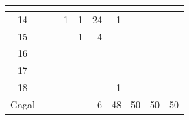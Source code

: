 \begin{minipage}[\minipagealign]{\minipagewidth}
{\begin{tabular}{|c|lllllllll|}
\multicolumn{1}{r|}{} & \multicolumn{1}{r|}{} & \\ \hline 14 & \multicolumn{1}{r|}{} & \multicolumn{1}{r|}{} & \multicolumn{1}{r|}{1} & \multicolumn{1}{r|}{1} & \multicolumn{1}{r|}{24} & \multicolumn{1}{r|}{1} & \multicolumn{1}{r|}{} & \multicolumn{1}{r|}{} & \\ \hline 15 & \multicolumn{1}{r|}{} & \multicolumn{1}{r|}{} & \multicolumn{1}{r|}{} & \multicolumn{1}{r|}{1} & \multicolumn{1}{r|}{4} & \multicolumn{1}{r|}{} & \multicolumn{1}{r|}{} & \multicolumn{1}{r|}{} & \\ \hline 16 & \multicolumn{1}{r|}{} & \multicolumn{1}{r|}{} & \multicolumn{1}{r|}{} & \multicolumn{1}{r|}{} & \multicolumn{1}{r|}{} & \multicolumn{1}{r|}{} & \multicolumn{1}{r|}{} & \multicolumn{1}{r|}{} & \\ \hline 17 & \multicolumn{1}{r|}{} & \multicolumn{1}{r|}{} & \multicolumn{1}{r|}{} & \multicolumn{1}{r|}{} & \multicolumn{1}{r|}{} & \multicolumn{1}{r|}{} & \multicolumn{1}{r|}{} & \multicolumn{1}{r|}{} & \\ \hline 18 & \multicolumn{1}{r|}{} & \multicolumn{1}{r|}{} & \multicolumn{1}{r|}{} & \multicolumn{1}{r|}{} & \multicolumn{1}{r|}{} & \multicolumn{1}{r|}{1} & \multicolumn{1}{r|}{} & \multicolumn{1}{r|}{} & \\ \hline Gagal & \multicolumn{1}{r|}{} & \multicolumn{1}{r|}{} & \multicolumn{1}{r|}{} & \multicolumn{1}{r|}{} & \multicolumn{1}{r|}{6} & \multicolumn{1}{r|}{48} & \multicolumn{1}{r|}{50} & \multicolumn{1}{r|}{50} & 50 \\ \hline
		\end{tabular}
	}
\end{minipage}

